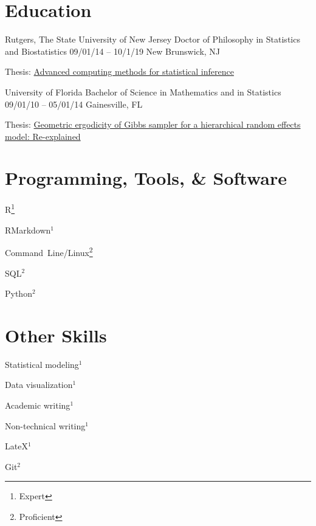 \documentclass[letterpaper]{resume_config}
\begin{document}

\section{Education}

\EducationExperience
    {Rutgers, The State University of New Jersey} %
    {Doctor of Philosophy in Statistics and Biostatistics} %
    {09/01/14 -- 10/1/19} %
    {New Brunswick, NJ} %
    {\item Thesis: \href{https://rucore.libraries.rutgers.edu/rutgers-lib/61966/}{Advanced computing methods for statistical inference} 
    }

\EducationExperience
    {University of Florida} %
    {Bachelor of Science in Mathematics and in Statistics} %
    {09/01/10 -- 05/01/14} %
    {Gainesville, FL} %
    {\item Thesis: \href{https://ufdc.ufl.edu/AA00057032/00001}{Geometric ergodicity of Gibbs sampler for a hierarchical random effects model: Re-explained}}

\vspace{-3mm}
\section{Programming, Tools, \& Software}
\begin{SkillsList}
    \item R\footnote{Expert} 
    \item RMarkdown$^1$
    \item Command~Line/Linux\footnote{Proficient} 
    \item SQL$^2$ 
    \item Python$^2$
\end{SkillsList}

\vspace{-3mm}
\section{Other Skills}
\begin{SkillsList}
    \item Statistical modeling$^1$
    \item Data visualization$^1$ 
    \item Academic writing$^1$
    \item Non-technical writing$^1$
    \item LateX$^1$ 
    \item Git$^2$
\end{SkillsList}
\end{document}
